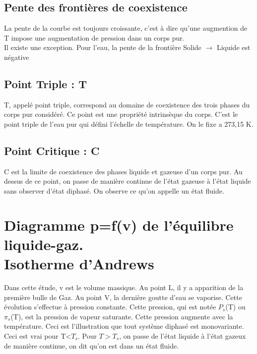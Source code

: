 \subsection{Pente des frontières de coexistence}
La pente de la courbe est toujours croissante, c'est à dire qu'une augmention de T impose une augmentation de pression dans un corps pur.\\
Il existe une exception. Pour l'eau, la pente de la frontière Solide $\rightarrow$ Liquide est négative
\subsection{Point Triple : T}
\begin{de}
 T, appelé point triple, correspond au domaine de coexistence des trois phases du corps pur considéré. Ce point est une propriété intrinsèque du corps. C'est le point triple de l'eau pur qui défini l'échelle de température. On le fixe a 273,15 K.
\end{de}
\subsection{Point Critique : C}
\begin{de}
 C est la limite de coexistence des phases liquide et gazeuse d'un corps pur. Au dessus de ce point, on passe de manière continue de l'état gazeuse à l'état liquide sans observer d'état diphasé. On observe ce qu'on appelle un état fluide.
\end{de}
\section{Diagramme p=f(v) de l'équilibre liquide-gaz.\\ Isotherme d'Andrews}
Dans cette étude, v est le volume massique.
Au point L, il y a apparition de la première bulle de Gaz. Au point V, la dernière goutte d'eau se vaporise. Cette évolution s'effectue à pression constante. Cette pression, qui est notée $P_s$(T) ou $\pi_s$(T), est la pression de vapeur saturante. Cette pression augmente avec la température. Ceci est l'illustration que tout système diphasé est monovariante. Ceci est vrai pour T<$T_s$. Pour $T>T_s$, on passe de l'état liquide à l'état gazeux de manière continue, on dit qu'on est dans un état fluide.
